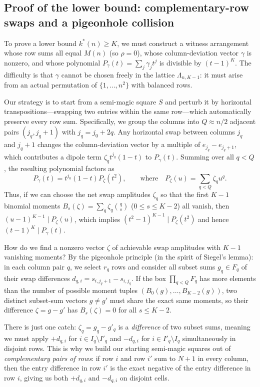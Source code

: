 \documentclass[11pt,a4paper]{article}
\theoremstyle{plain}
\theoremstyle{definition}
\theoremstyle{remark}
\begin{document}
\subsection{Proof of the lower bound: complementary-row swaps and a pigeonhole collision}
\label{sec:kstar_lower}

To prove a lower bound $k^*(n)\ge K$, we must construct a witness arrangement whose row sums all equal $M(n)$ (so $\rho=0$), whose column-deviation vector $\gamma$ is nonzero, and whose polynomial $P_\gamma(t)=\sum_j\gamma_jt^j$ is divisible by $(t-1)^K$. The difficulty is that $\gamma$ cannot be chosen freely in the lattice $\Lambda_{n,K-1}$: it must arise from an actual permutation of $\{1,\dots,n^2\}$ with balanced rows.

Our strategy is to start from a semi-magic square $S$ and perturb it by horizontal transpositions—swapping two entries within the same row—which automatically preserve every row sum. Specifically, we group the columns into $Q\approx n/2$ adjacent pairs $(j_q, j_q+1)$ with $j_q=j_0+2q$. Any horizontal swap between columns $j_q$ and $j_q+1$ changes the column-deviation vector by a multiple of $e_{j_q}-e_{j_q+1}$, which contributes a dipole term $\zeta_q t^{j_q}(1-t)$ to $P_\gamma(t)$. Summing over all $q<Q$, the resulting polynomial factors as
\[
P_\gamma(t)=t^{j_0}(1-t)P_\zeta(t^2),\qquad\text{where}\quad P_\zeta(u)=\sum_{q<Q}\zeta_q u^q.
\]
Thus, if we can choose the net swap amplitudes $\zeta_q$ so that the first $K-1$ binomial moments $B_s(\zeta)=\sum_q\zeta_q\binom qs$ ($0\le s\le K-2$) all vanish, then $(u-1)^{K-1}\mid P_\zeta(u)$, which implies $(t^2-1)^{K-1}\mid P_\zeta(t^2)$ and hence $(t-1)^K\mid P_\gamma(t)$.

How do we find a nonzero vector $\zeta$ of achievable swap amplitudes with $K-1$ vanishing moments? By the pigeonhole principle (in the spirit of Siegel's lemma): in each column pair $q$, we select $r_q$ rows and consider all subset sums $g_q \in F_q$ of their swap differences $d_{q,i}=s_{i,j_q+1}-s_{i,j_q}$. If the box $\prod_{q<Q} F_q$ has more elements than the number of possible moment tuples $(B_0(g),\dots,B_{K-2}(g))$, two distinct subset-sum vectors $g\ne g'$ must share the exact same moments, so their difference $\zeta = g - g'$ has $B_s(\zeta)=0$ for all $s\le K-2$.

There is just one catch: $\zeta_q = g_q - g'_q$ is a \emph{difference} of two subset sums, meaning we must apply $+d_{q,i}$ for $i\in I_q\setminus I'_q$ and $-d_{q,i}$ for $i\in I'_q\setminus I_q$ simultaneously in disjoint rows. This is why we build our starting semi-magic squares out of \emph{complementary pairs of rows}: if row $i$ and row $i'$ sum to $N+1$ in every column, then the entry difference in row $i'$ is the exact negative of the entry difference in row $i$, giving us both $+d_{q,i}$ and $-d_{q,i}$ on disjoint cells.
\end{document}
